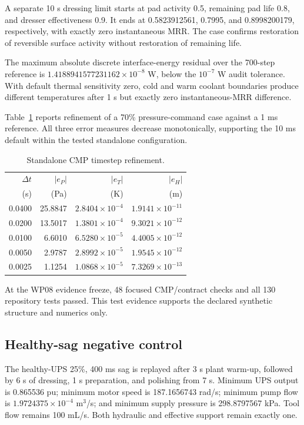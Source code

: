 \documentclass[10pt,twocolumn]{article}
\begin{document}
A separate 10 s dressing limit starts at pad activity 0.5, remaining pad life
0.8, and dresser effectiveness 0.9. It ends at 0.5823912561, 0.7995, and
0.8998200179, respectively, with exactly zero instantaneous MRR. The case
confirms restoration of reversible surface activity without restoration of
remaining life.

The maximum absolute discrete interface-energy residual over the 700-step
reference is $1.4188941577231162\times10^{-8}$ W, below the
$10^{-7}$ W audit tolerance. With default thermal sensitivity zero, cold and
warm coolant boundaries produce different temperatures after 1 s but exactly
zero instantaneous-MRR difference.

Table~\ref{tab:timestep} reports refinement of a 70\% pressure-command case
against a 1 ms reference. All three error measures decrease monotonically,
supporting the 10 ms default within the tested standalone configuration.

\begin{table}[t]
\centering
\caption{Standalone CMP timestep refinement.}
\label{tab:timestep}
\small
\begin{tabular}{rrrr}
\toprule
$\Delta t$ & $|e_P|$ & $|e_T|$ & $|e_H|$\\
(s) & (Pa) & (K) & (m)\\
\midrule
0.0400 & 25.8847 & $2.8404\times10^{-4}$ & $1.9141\times10^{-11}$\\
0.0200 & 13.5017 & $1.3801\times10^{-4}$ & $9.3021\times10^{-12}$\\
0.0100 &  6.6010 & $6.5280\times10^{-5}$ & $4.4005\times10^{-12}$\\
0.0050 &  2.9787 & $2.8992\times10^{-5}$ & $1.9545\times10^{-12}$\\
0.0025 &  1.1254 & $1.0868\times10^{-5}$ & $7.3269\times10^{-13}$\\
\bottomrule
\end{tabular}
\end{table}

At the WP08 evidence freeze, 48 focused CMP/contract checks and all 130
repository tests passed. This test evidence supports the declared synthetic
structure and numerics only.

\subsection{Healthy-sag negative control}

The healthy-UPS 25\%, 400 ms sag is replayed after 3 s plant warm-up, followed
by 6 s of dressing, 1 s preparation, and polishing from 7 s. Minimum UPS
output is 0.865536 pu; minimum motor speed is 187.1656743 rad/s; minimum pump
flow is $1.9724375\times10^{-4}$ m$^3$/s; and minimum supply pressure is
298.8797567 kPa. Tool flow remains 100 mL/s. Both hydraulic and effective
support remain exactly one.
\end{document}
